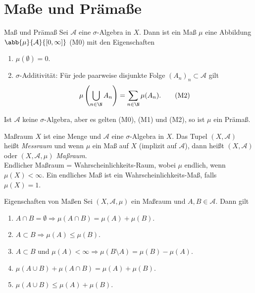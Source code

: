 \section*{Maße und Prämaße}

\begin{karte}{Maß und Prämaß}
	Sei \( \mathcal{A} \) eine \( \sigma \)-Algebra in \(X\). 
	Dann ist ein Maß \(\mu\) eine Abbildung \( \abb{\mu}{\mathcal{A}}{[0,\infty]} \) (M0) 
	mit den Eigenschaften 
	\begin{enumerate}
		\item \(\mu(\emptyset) = 0\). 
		\item \(\sigma\)-Additivität: Für jede paarweise disjunkte Folge \( (A_n)_n \subset \mathcal{A} \) gilt 
		\[ \mu\left( \bigcup_{n\in\N} A_n \right) = \sum_{n\in\N} \mu(A_n). \tag{M2} \]
	\end{enumerate}
	Ist \( \mathcal{A} \) keine \(\sigma\)-Algebra, aber es gelten (M0), (M1) und (M2), so ist \(\mu\) 
	ein Prämaß.
\end{karte}

\begin{karte}{Maßraum}
	\(X\) ist eine Menge und \(\mathcal{A}\) eine \(\sigma\)-Algebra in \(X\). 
	Das Tupel \( (X,\mathcal{A}) \) heißt \textit{Messraum} und wenn \(\mu\) ein 
	Maß auf \(X\) (implizit auf \(\mathcal{A}\)), dann heißt \( (X, \mathcal{A}) \) 
	oder \( (X, \mathcal{A}, \mu) \) \textit{Maßraum}.\\
	Endlicher Maßraum = Wahrscheinlichkeits-Raum, wobei \(\mu \) endlich, wenn \( \mu(X) < \infty \). 
	Ein endliches Maß ist ein Wahrscheinlichkeits-Maß, falls \(\mu(X) = 1\).
\end{karte}

\begin{karte}{Eigenschaften von Maßen}
	Sei \( (X, \mathcal{A}, \mu) \) ein Maßraum und \(A,B \in \mathcal{A}\). Dann gilt
	\begin{enumerate}
		\item \(A\cap B = \emptyset \Rightarrow \mu(A\cap B) = \mu(A) + \mu(B)\).
		\item \(A \subset B \Rightarrow \mu(A) \leq \mu(B)\).
		\item \(A \subset B\) und \( \mu(A) < \infty \Rightarrow \mu(B \setminus A) = \mu(B) - \mu(A) \).
		\item \( \mu(A \cup B) + \mu(A\cap B) = \mu(A) + \mu(B) \).
		\item \( \mu(A \cup B) \leq \mu(A) + \mu(B) \).
	\end{enumerate}
\end{karte}

